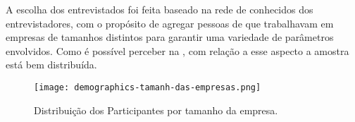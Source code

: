 A escolha dos entrevistados foi feita baseado na rede de conhecidos dos entrevistadores, com o propósito de agregar pessoas de que trabalhavam em empresas de tamanhos distintos para garantir uma variedade de parâmetros envolvidos. Como é possível perceber na , com relação a esse aspecto a amostra está bem distribuída. 


\begin{figure}[ht]
\begin{center}
\texttt{[image: demographics-tamanh-das-empresas.png]}
\end{center}
\caption[Distribuição dos Participantes por tamanho da empresa]{
    Distribuição dos Participantes por tamanho da empresa.
}\label{tamanho_empresa}
\end{figure}


